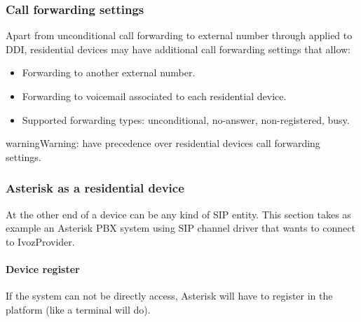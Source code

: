 \documentclass[letterpaper,10pt,english]{sphinxmanual}
\begin{document}
\subsubsection{Call forwarding settings}
\label{administration_portal/client/residential/residential_devices:call-forwarding-settings}
Apart from unconditional call forwarding to external number through {\hyperref[administration_portal/client/vpbx/routing_tools/external_call_filters:external\string-call\string-filters]{}} applied to DDI,
residential devices may have additional call forwarding settings that allow:
\begin{itemize}
\item {} 
Forwarding to another external number.

\item {} 
Forwarding to voicemail associated to each residential device.

\item {} 
Supported forwarding types: unconditional, no-answer, non-registered, busy.

\end{itemize}

\begin{notice}{warning}{Warning:}
{\hyperref[administration_portal/client/vpbx/routing_tools/external_call_filters:external\string-call\string-filters]{}} have precedence over residential devices call forwarding settings.
\end{notice}


\subsubsection{Asterisk as a residential device}
\label{administration_portal/client/residential/residential_devices:asterisk-as-a-residential-device}
At the other end of a device can be any kind of SIP entity. This section takes
as example an Asterisk PBX system using SIP channel driver that wants to connect
to IvozProvider.


\paragraph{Device register}
\label{administration_portal/client/residential/residential_devices:device-register}
If the system can not be directly access, Asterisk will have to register in the
platform (like a terminal will do).
\end{document}
